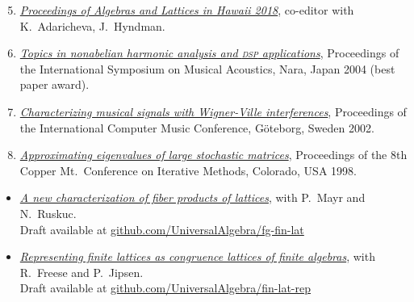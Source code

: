 \documentclass{article}
\begin{document}
    \begin{enumerate}
      \setcounter{enumi}{4}

     \item \href{http://www.lulu.com/shop/kira-adaricheva-and-william-demeo-and-jennifer-hyndman/algebras-and-lattices-in-hawaii-honoring-ralph-freese-bill-lampe-and-jb-nation/paperback/product-23634583.html}{\it Proceedings of Algebras and Lattices in Hawaii 2018}, co-editor with K.~Adaricheva, J.~Hyndman.

    \item \href{https://github.com/williamdemeo/ISMA2004/raw/master/DeMeo-ISMA2004-FinalPaper.pdf}%
           {{\it Topics in nonabelian harmonic analysis and \textsc{dsp}  applications}},
      Proceedings of the International Symposium on Musical Acoustics, Nara, Japan 2004
      (best paper award).

    \item \href{https://github.com/williamdemeo/ICMC2002/raw/master/DeMeo-ICMC2002.pdf}%
           {\it Characterizing musical signals with Wigner-Ville interferences},
      Proceedings of the International Computer Music Conference, G\"{o}teborg, Sweden 2002.

     \item \href{https://williamdemeo.github.io/MSThesis}%
           {{\it Approximating eigenvalues of large stochastic matrices}},
      Proceedings of the 8th Copper Mt.~Conference on Iterative Methods,
      Colorado, USA 1998.
    \end{enumerate}


    \vskip1cm

    \begin{itemize}
         \item[] \href{https://github.com/UniversalAlgebra/fg-free-lat}
           {{\it A new characterization of fiber products of lattices}},
           with P.~Mayr and N.~Ruskuc. \\
           {\small Draft available at} \href{https://github.com/UniversalAlgebra/fg-free-lat}{{\small github.com/UniversalAlgebra/fg-fin-lat}}


    \item[] \href{https://github.com/UniversalAlgebra/fin-lat-rep}
           {{\it Representing finite lattices as congruence lattices of finite algebras}},
           with R.~Freese and P.~Jipsen. \\
           {\small Draft available at} \href{https://github.com/UniversalAlgebra/fin-lat-rep}{{\small github.com/UniversalAlgebra/fin-lat-rep}}
\end{itemize}
\vskip1cm
\end{document}
